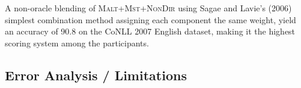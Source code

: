 \documentclass[11pt]{article}
\begin{document}
\begin{table}[t]
   \begin{center}
   \end{center}
   \caption{Parser combination with Oracle, choosing the highest scoring parse for each sentence of the test-set.}
   \label{tbl:oracle-combine}
\end{table}

\vspace{-5pt}
A non-oracle blending of \textsc{Malt}+\textsc{Mst}+\textsc{NonDir} using Sagae and Lavie's (2006) simplest combination method assigning each component the same weight, yield an accuracy of 90.8 on the CoNLL 2007 English dataset, making it the highest scoring system among the participants.

\vspace{-6pt}
\subsection{Error Analysis / Limitations}
\end{document}
